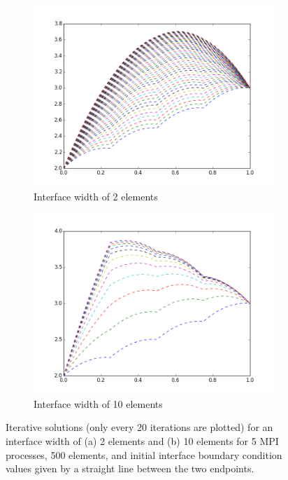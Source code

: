 \documentclass[10pt]{article}
\begin{document}
\begin{figure}[H]
        \centering
        \begin{subfigure}[b]{0.5\textwidth}
                \centering
                \includegraphics[width=\textwidth]{../figures/interface1.png}
                \caption{Interface width of 2 elements}
        \end{subfigure}%
                \begin{subfigure}[b]{0.5\textwidth}
                \centering
                \includegraphics[width=\textwidth]{../figures/interface2.png}
                \caption{Interface width of 10 elements}
        \end{subfigure}%
        \caption{Iterative solutions (only every 20 iterations are plotted) for an interface width of (a) 2 elements and (b) 10 elements for 5 MPI processes, 500 elements, and initial interface boundary condition values given by a straight line between the two endpoints.}
\label{fig:interface}
\end{figure}
\end{document}
